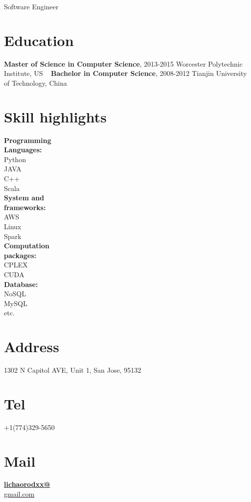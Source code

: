\documentclass[]{friggeri-cv}
\begin{document}
{Software Engineer}


\begin{aside}
	\section{Education}
	\textbf{Master of Science in 
	Computer Science}, 
	2013-2015
	Worcester Polytechnic 
	Institute, US
	~
	\textbf{Bachelor in 
	Computer Science}, 
	2008-2012
	Tianjin University of 
	Technology, China
	\section{Skill highlights}
	\textbf{Programming \\Languages:} \\Python\\ JAVA\\ C++\\ Scala \\
	\textbf{System and \\frameworks:} \\AWS\\ Linux\\ Spark\\ 
	\textbf{Computation \\packages:} \\CPLEX\\ CUDA\\ 
	\textbf{Database:} \\NoSQL\\ MySQL\\ etc.
	~
	\section{Address}
	1302 N Capitol AVE,
	Unit 1,
	San Jose, 95132
	\section{Tel}
	+1(774)329-5650
	\section{Mail}
	\href{mailto:lichaorodxx@gmail.com}{\textbf{lichaorodxx@}\\gmail.com}
	~

\end{aside}
\end{document}
